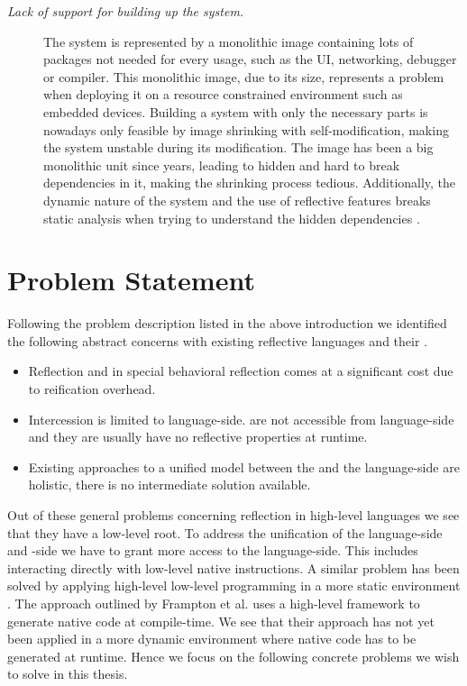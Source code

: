 \begin{description}
\item[\emph{Lack of support for building up the system.}] The system is represented by a monolithic image containing lots of packages not needed for every usage, such as the UI, networking, debugger or compiler. This monolithic image, due to its size, represents a problem when deploying it on a resource constrained environment such as embedded devices. Building a system with only the necessary parts is nowadays only feasible by image shrinking with self-modification, making the system unstable during its modification.
The image has been a big monolithic unit since years, leading to hidden and hard to break dependencies in it, making the shrinking process tedious. Additionally, the dynamic nature of the system and the use of reflective features breaks static analysis when trying to understand the hidden dependencies \cite{Livs05a}.
\end{description}


\section{Problem Statement}

Following the problem description listed in the above introduction we identified the following abstract concerns with existing reflective languages and their \VMs.
%
\begin{itemize}
	\item Reflection and in special behavioral reflection comes at a significant cost due to reification overhead.
		
	\item Intercession is limited to language-side.
	\VMs are not accessible from language-side and they are usually have no reflective properties at runtime. 
	
	\item Existing approaches to a unified model between the \VM and the language-side are holistic, there is no intermediate solution available.
\end{itemize}

\noindent Out of these general problems concerning reflection in high-level languages we see that they have a low-level root.
To address the unification of the language-side and \VM-side we have to grant more access to the language-side.
This includes interacting directly with low-level native instructions.
A similar problem has been solved by applying high-level low-level programming in a more static environment \cite{Fram09a,Graal}.
The approach outlined by Frampton et al. uses a high-level framework to generate native code at compile-time.
We see that their approach has not yet been applied in a more dynamic environment where native code has to be generated at runtime.
Hence we focus on the following concrete problems we wish to solve in this thesis.

